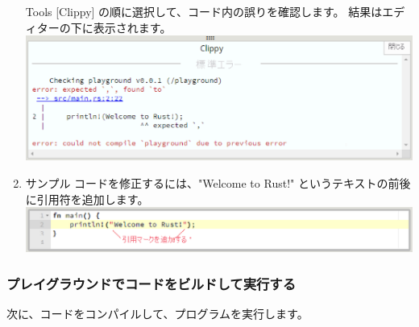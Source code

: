 \begin{enumerate}
\item [Tools][Clippy] の順に選択して、コード内の誤りを確認します。 結果はエディターの下に表示されます。
\includegraphics[width=14cm]{rust-playground-clippy.eps}

\item サンプル コードを修正するには、"Welcome to Rust!" というテキストの前後に引用符を追加します。
\includegraphics[width=14cm]{rust-playground-add-quotes.eps}

\end{enumerate}


\subsubsection{プレイグラウンドでコードをビルドして実行する}

次に、コードをコンパイルして、プログラムを実行します。

